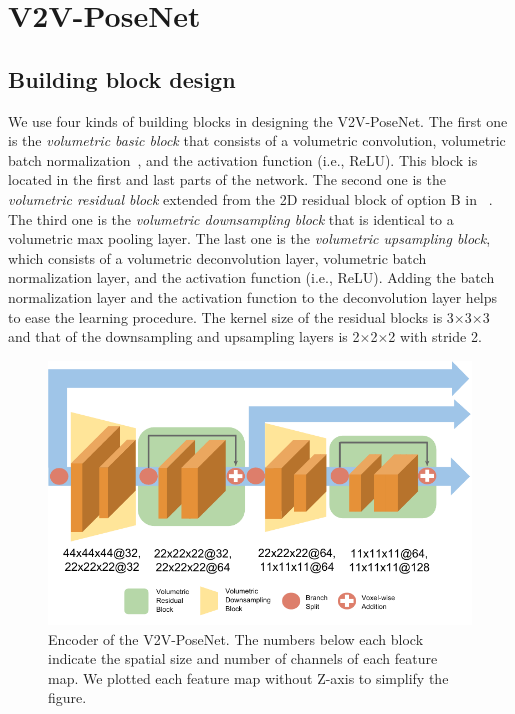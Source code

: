 \section{V2V-PoseNet}
\label{V2V-PoseNet_Section}

\subsection{Building block design}
We use four kinds of building blocks in designing the V2V-PoseNet. The first one is the \emph{volumetric basic block} that consists of a volumetric convolution, volumetric batch normalization~\cite{ioffe2015batch}, and the activation function (i.e., ReLU). This block is located in the first and last parts of the network. The second one is the \emph{volumetric residual block} extended from the 2D residual block of option B in ~\cite{he2016deep}. The third one is the \emph{volumetric downsampling block} that is identical to a volumetric max pooling layer. The last one is the \emph{volumetric upsampling block}, which consists of a volumetric deconvolution layer, volumetric batch normalization layer, and the activation function (i.e., ReLU). Adding the batch normalization layer and the activation function to the deconvolution layer helps to ease the learning procedure. The kernel size of the residual blocks is 3$\times$3$\times$3 and that of the downsampling and upsampling layers is 2$\times$2$\times$2 with stride 2.


\begin{figure}[t]
\begin{center}
   \includegraphics[width=1.0\linewidth]{encoder.pdf}
\end{center}
\vspace*{-5mm}
   \caption{Encoder of the V2V-PoseNet. The numbers below each block indicate the spatial size and number of channels of each feature map. We plotted each feature map without Z-axis to simplify the figure.}
\vspace*{-4mm}
\label{fig:encoder}
\end{figure}


